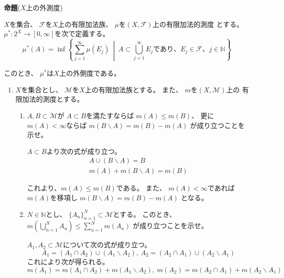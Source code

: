 \documentclass[12pt,b5paper]{ltjsarticle}
\begin{document}
\textbf{命題}($X$上の外測度)

$X$を集合、
$\mathcal{F}$を$X$上の有限加法族、
$\mu$を$(X,\mathcal{F})$上の有限加法的測度
とする。
$\mu^{*}:2^{X}\to [0,\infty]$を次で定義する。
\begin{equation}
 \mu^{*}(A)
  = \inf\left\{
         \sum_{j=1}^{\infty}\mu(E_{j})
         \ \middle| \
         A \subset \bigcup_{j=1}^{\infty}E_{j}
         であり、
         E_{j}\in\mathcal{F}
         、j\in\mathbb{N}
        \right\}
\end{equation}

このとき、
$\mu^{*}$は$X$上の外側度である。



\hrulefill

\begin{enumerate}
 \item
      $X$を集合とし、
      $\mathcal{M}$を$X$上の有限加法族とする。
      また、
      $m$を$(X,\mathcal{M})$上の
      有限加法的測度とする。
      \begin{enumerate}
       \item
            $A,B\subset \mathcal{M}$が
            $A\subset B$を満たすならば
            $m(A)\leq m(B)$、
            更に
            $m(A)<\infty$ならば
            $m(B\backslash A) = m(B)- m(A)$
            が成り立つことを示せ。

            \dotfill

            $A\subset B$より次の式が成り立つ。
            \begin{gather}
             A \cup (B\backslash A) = B\\
             m(A)+m(B\backslash A) = m(B)
            \end{gather}

            これより、$m(A) \leq m(B)$である。
            また、
            $m(A)<\infty$であれば$m(A)$を移項し
            $m(B\backslash A) = m(B)- m(A)$
            となる。

            \hrulefill

       \item
            $N\in\mathbb{N}$とし、
            $\{A_{n}\}_{n=1}^{N}\subset \mathcal{M}$とする。
            このとき、
            $m\left( \bigcup_{n=1}^{N}A_{n} \right) \leq \sum_{n=1}^{N}m(A_{n})$
            が成り立つことを示せ。

            \dotfill

            $A_{1},A_{2}\subset \mathcal{M}$について次の式が成り立つ。
            \begin{equation}
             A_{1}=(A_{1}\cap A_{2})\cup (A_{1}\backslash A_{2}),\
             A_{2}=(A_{2}\cap A_{1})\cup (A_{2}\backslash A_{1})
            \end{equation}
            これにより次が得られる。
            \begin{equation}
              m(A_{1})=m(A_{1}\cap A_{2}) + m(A_{1}\backslash A_{2}),\
              m(A_{2})=m(A_{2}\cap A_{1}) + m(A_{2}\backslash A_{1})
            \end{equation}


\end{enumerate}
\end{enumerate}
\end{document}
